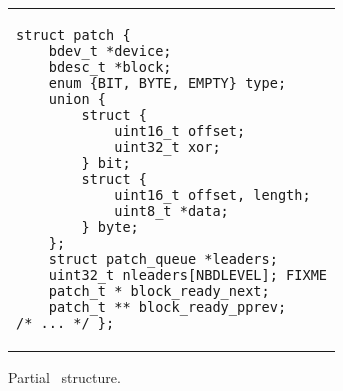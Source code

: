 \section {\ChDescs}
\label{sec:chdescs}

\newcommand{\ChAll}{\ensuremath{\textit{All}}}
\newcommand{\ChAllB}[1]{\ensuremath{\textit{All}[#1]}}
\newcommand{\ChMem}{\ensuremath{\textit{Mem}}}
\newcommand{\ChMemB}[1]{\ensuremath{\textit{Mem}[#1]}}
\newcommand{\ChDisk}{\ensuremath{\textit{Disk}}}
\newcommand{\ChDiskB}[1]{\ensuremath{\textit{Disk}[#1]}}
\newcommand{\ChInf}{\ensuremath{\textit{Inf}}}
\newcommand{\ChInfB}[1]{\ensuremath{\textit{Inf\/}[#1]}}
\newcommand{\ChRb}{\ensuremath{\textit{\Rb}}}
\newcommand{\ChRbB}[1]{\ensuremath{\textit{\Rb}[#1]}}
\newcommand{\ChNrb}{\ensuremath{\textit{\Nrb}}}
\newcommand{\ChNrbB}[1]{\ensuremath{\textit{\Nrb}[#1]}}
\newcommand{\ChNoop}{\ensuremath{\textit{\Noop}}}

\newcommand{\Before}[1]{\ensuremath{\textit{Pre}[#1]}}
\newcommand{\BeforeS}[1]{\ensuremath{\textit{Pre}^*[#1]}}
\newcommand{\After}[1]{\ensuremath{\textit{Post}[#1]}}
\newcommand{\AfterS}[1]{\ensuremath{\textit{Post}^*[#1]}}

\newcommand{\statenone}{\ensuremath{\textit{inmem}}}
\newcommand{\stateinf}{\ensuremath{\textit{inflight}}}
\newcommand{\statedisk}{\ensuremath{\textit{ondisk}}}

\begin{figure}[t]
\vskip-14pt
\begin{tabular}{@{\hskip0.58in}p{2in}@{}}
\begin{scriptsize}
\begin{verbatim}
struct patch {
    bdev_t *device;
    bdesc_t *block;
    enum {BIT, BYTE, EMPTY} type;
    union {
        struct {
            uint16_t offset;
            uint32_t xor;
        } bit;
        struct {
            uint16_t offset, length;
            uint8_t *data;
        } byte;
    };
    struct patch_queue *leaders;
    uint32_t nleaders[NBDLEVEL]; FIXME
    patch_t * block_ready_next;
    patch_t ** block_ready_pprev;
/* ... */ };
\end{verbatim}
\end{scriptsize}
\end{tabular}
\vspace{-10pt}
\caption{\label{fig:chdesc} Partial \chdesc\ structure.}
\end{figure}

